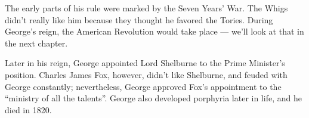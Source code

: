 The early parts of his rule were marked by the Seven Years' War.
The Whigs didn't really like him because they thought he favored the Tories.
During George's reign, the American Revolution would take place --- we'll look at that in the next chapter.

Later in his reign, George appointed Lord Shelburne to the Prime Minister's position.
Charles James Fox, however, didn't like Shelburne, and feuded with George constantly;
nevertheless, George approved Fox's appointment to the ``ministry of all the talents''.
George also developed porphyria later in life, and he died in 1820.
